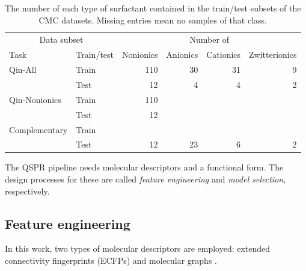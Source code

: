 \begin{table}
    \centering
    \caption{The number of each type of surfactant contained in the train/test subsets of the CMC datasets. Missing entries mean no samples of that class.}
    \label{tab:data-split}
    \begin{tabular}{@{}llrrrr@{}} \toprule \multicolumn{2}{c}{Data subset} & \multicolumn{4}{c}{Number of}                                                    \\\cmidrule(r){1-2}\cmidrule(l){3-6}
               Task                                                    & Train/test                    & Nonionics & Anionics & Cationics & Zwitterionics \\\midrule
               Qin-All                                                 & Train                         & 110       & 30       & 31        & 9             \\
                                                                       & Test                          & 12        & 4        & 4         & 2             \\
               Qin-Nonionics                                           & Train                         & 110       &          &           &               \\
                                                                       & Test                          & 12        &          &           &               \\
               Complementary                                                    & Train                         &           &          &           &               \\
                                                                       & Test                          & 12        & 23       & 6         & 2             \\\bottomrule
    \end{tabular}
\end{table}

The QSPR pipeline needs molecular descriptors and a functional form. The design
processes for these are called \emph{feature engineering} and \emph{model
selection}, respectively.

\subsection{Feature engineering}

In this work, two types of molecular descriptors are employed: extended
connectivity fingerprints (ECFPs)
\cite{rogersExtendedConnectivityFingerprints2010} and molecular graphs
\cite{merkwirthAutomaticGenerationComplementary2005}.

